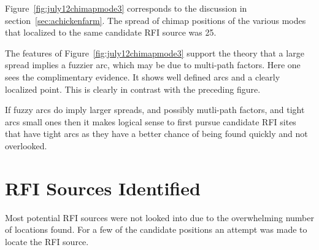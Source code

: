 \documentclass[a4paper,12pt]{article}
\begin{document}
                                                                                                                                                    Figure~\ref{fig:july12chimapmode3} corresponds to the discussion in section~\ref{sec:achickenfarm}. The spread of chimap positions of the various modes that localized to the same candidate RFI source was \unit{25}{\metre}.

                                                                                                                                                    The features of Figure~\ref{fig:july12chimapmode3} support the theory that a large spread implies a fuzzier arc, which may be due to multi-path factors. Here one sees the complimentary evidence. It shows well defined arcs and a clearly localized point. This is clearly in contrast with the preceding figure. 

                                                                                                                                                    If fuzzy arcs do imply larger spreads, and possibly mutli-path factors, and tight arcs small ones then it makes logical sense to first pursue candidate RFI sites that have tight arcs as they have a better chance of being found quickly and not overlooked.

                                                                                                                                                                                            \section{RFI Sources Identified}
                                                                                                                                                                                                                \label{sec:rfisourcesidentified}

                                                                                                                                                                                                                                                        Most potential RFI sources were not looked into due to the overwhelming number of locations found. For a few of the candidate positions an attempt was made to locate the RFI source. 
\end{document}

